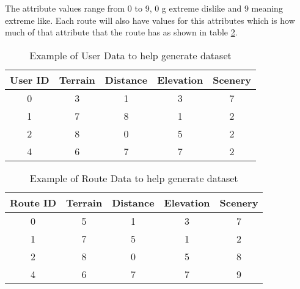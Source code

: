 The attribute values range from 0 to 9, 0 g extreme dislike and 9 meaning extreme like. Each route will also have values for this attributes which is how much of that attribute that the route has as shown in table \ref{tab:genRouteDataset}.

\begin{table}[ht]
    \centering
    \begin{tabular}{|c|c|c|c|c|}
        \hline
         User ID & Terrain & Distance & Elevation & Scenery  \\
         \hline
         \hline
         0 & 3 & 1 & 3 & 7  \\
         1 & 7 & 8 & 1 & 2 \\
         2 & 8 & 0 & 5 & 2 \\
         4 & 6 & 7 & 7 & 2 \\
         \hline
    \end{tabular}
    \caption{Example of User Data to help generate dataset}
    \label{tab:genUserDataset}
\end{table}

\begin{table}[ht]
    \centering
    \begin{tabular}{|c|c|c|c|c|}
        \hline
         Route ID & Terrain & Distance & Elevation & Scenery  \\
         \hline
         \hline
         0 & 5 & 1 & 3 & 7  \\
         1 & 7 & 5 & 1 & 2 \\
         2 & 8 & 0 & 5 & 8 \\
         4 & 6 & 7 & 7 & 9 \\
         \hline
    \end{tabular}
    \caption{Example of Route Data to help generate dataset}
    \label{tab:genRouteDataset}
\end{table}

